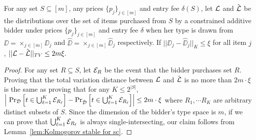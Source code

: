 \begin{lemma}\label{lem:stable demand set}
	For any set $S\subseteq [m]$, any prices $\{p_j\}_{j\in[m]}$ and entry fee $\delta(S)$, let ${\mathcal{L}}$ and $\hat{{\mathcal{L}}}$ be the distributions over the set of items purchased from $S$ by a constrained additive bidder under prices $\{p_j\}_{j\in[m]}$ and entry fee $\delta$ when her type is drawn from $\DD=\times_{j\in[m]} \DD_j$ and $\hat{\DD}=\times_{j\in[m]} \hat{\DD}_j$ respectively. If $||\DD_{j}-\hat{\DD}_{j}||_K\leq \xi$ for all item $j$, $||{\mathcal{L}}-\hat{{\mathcal{L}}}||_{TV}\leq 2m \xi.$
\end{lemma}
\begin{proof}

For any set $R\subseteq S$, let ${\mathcal{E}}_R$ be the event that the bidder purchases set $R$. Proving that the total variation distance between ${\mathcal{L}}$ and $\hat{{\mathcal{L}}}$ is no more than $2m\cdot \xi$ is the same as proving that for any $K\leq 2^{|S|}$, $\left|\ \Pr_{{\mathcal{D}}}\left[t\in \bigcup_{\ell=1}^K {\mathcal{E}}_{R_\ell}\right]-\Pr_{\hat{{\mathcal{D}}}}\left[t\in \bigcup_{\ell=1}^K {\mathcal{E}}_{R_\ell}\right]\right|\leq 2m\cdot \xi$ where $R_1,\cdots R_K$ are arbitrary distinct subsets of $S$. Since the dimension of the bidder's type space is $m$, if we can prove that $\bigcup_{\ell=1}^K {\mathcal{E}}_{R_\ell}$ is always single-intersecting, our claim follows from Lemma~\ref{lem:Kolmogorov stable for sc}. 


\end{proof}
